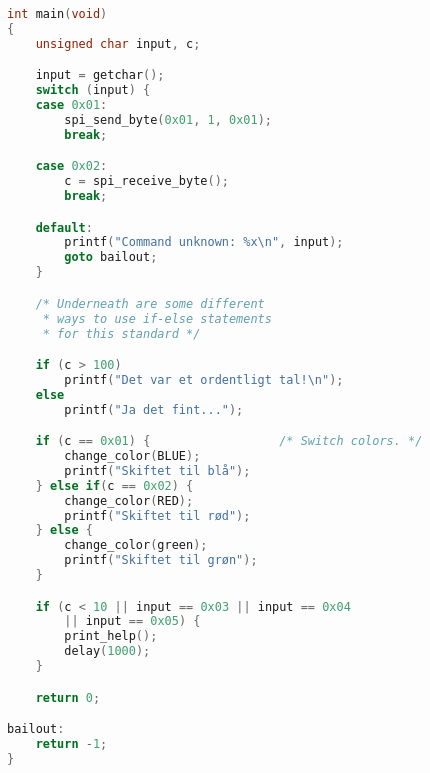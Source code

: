 \documentclass[article, 10pt]{memoir}
\begin{document}
\begin{landscape}
\begin{multicols}{2}
\begin{lstlisting}[language=c]
int main(void)
{
    unsigned char input, c;

    input = getchar();
    switch (input) {
    case 0x01:
        spi_send_byte(0x01, 1, 0x01);
        break;

    case 0x02:
        c = spi_receive_byte();
        break;

    default:
        printf("Command unknown: %x\n", input);
        goto bailout;
    }

    /* Underneath are some different 
     * ways to use if-else statements
     * for this standard */

    if (c > 100)
        printf("Det var et ordentligt tal!\n");
    else
        printf("Ja det fint...");

    if (c == 0x01) {                  /* Switch colors. */
        change_color(BLUE);
        printf("Skiftet til blå");
    } else if(c == 0x02) {
        change_color(RED);
        printf("Skiftet til rød");
    } else {
        change_color(green);
        printf("Skiftet til grøn");
    }

    if (c < 10 || input == 0x03 || input == 0x04
        || input == 0x05) {
        print_help();
        delay(1000);
    }

    return 0;

bailout:
    return -1;
}
\end{lstlisting}
\end{multicols}
\end{landscape}
\end{document}
